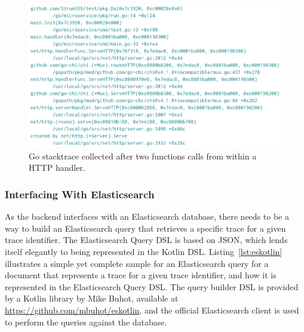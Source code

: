 \documentclass[12pt,pdftex,titlepage]{report}
\begin{document}
                    \begin{figure}[hbt!]
                        \centering
                        \includegraphics[scale=0.45]{gostack.png}
                        \caption{Go stacktrace collected after two functions calls from within a HTTP handler.}
                        \label{fig:gostack}
                    \end{figure}
                
                \subsubsection{Interfacing With Elasticsearch}
                    As the backend interfaces with an Elasticsearch database, there needs to be a way to build an Elasticsearch query that retrieves a specific trace for a given trace identifier. The Elasticsearch Query DSL
                    is based on JSON, which lends itself elegantly to being represented in the Kotlin DSL. Listing~\ref{lst:eskotlin} illustrates a simple yet complete sample for an Elasticsearch query for a document that
                    represents a trace for a given trace identifier, and how it is represented in the Elasticsearch Query DSL. The query builder DSL is provided by a Kotlin library by Mike Buhot, available at 
                    \url{https://github.com/mbuhot/eskotlin}, and the official Elasticsearch client is used to perform the queries against the database.
\end{document}
